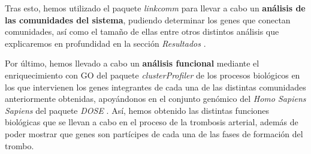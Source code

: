 Tras esto, hemos utilizado el paquete \textit{linkcomm} \cite{linkcomm} para llevar a cabo un \textbf{análisis de las comunidades del sistema}, pudiendo determinar los genes que conectan comunidades, así como el tamaño de ellas entre otros distintos análisis que explicaremos en profundidad en la sección \textit{Resultados} .

Por último, hemos llevado a cabo un \textbf{análisis funcional} mediante el enriquecimiento con GO del paquete \textit{clusterProfiler} \cite{clusterProfiler} de los procesos biológicos en los que intervienen los genes integrantes de cada una de las distintas comunidades anteriormente obtenidas, apoyándonos en el conjunto genómico del \textit{Homo Sapiens Sapiens} del paquete \textit{DOSE} \cite{DOSE}.  Así, hemos obtenido las distintas funciones biológicas que se llevan a cabo en el proceso de la trombosis arterial, además de poder mostrar que genes son partícipes de cada una de las fases de formación del trombo.
